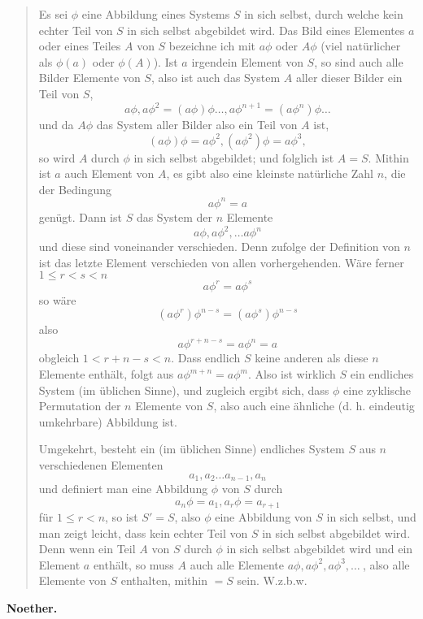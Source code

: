\documentclass[leqno,hidelinks]{article}
\theoremstyle{definition}
\begin{document}
\begin{paracol}{2}
\begin{quote}
\hspace{12pt} Es sei $\phi$ eine Abbildung eines Systems $S$ in sich selbst, durch
welche kein echter Teil von $S$ in sich selbst abgebildet wird. Das Bild eines
Elementes $a$ oder eines Teiles $A$ von $S$ bezeichne ich mit $a\phi$ oder $A\phi$
(viel natürlicher als $\phi(a)$ oder $\phi(A)$). Ist $a$ irgendein Element von $S$,
so sind auch alle Bilder Elemente von $S$, also ist auch das System $A$ aller dieser
Bilder ein Teil von $S$,
\[
	a\phi, a\phi^2= (a\phi)\phi \ldots, a\phi^{n+1} = (a\phi^n)\phi \ldots
\]
und da $A\phi$ das System aller Bilder also ein Teil von $A$ ist,
\[
	(a\phi) \phi = a\phi^2, (a\phi^2)\phi = a\phi^3,
\]
so wird $A$ durch $\phi$ in sich selbst abgebildet; und folglich ist $A = S$.
Mithin ist $a$ auch Element von $A$,  es gibt also eine kleinste natürliche Zahl
$n$, die der Bedingung%
\[
	a\phi^n = a
\]
genügt. Dann ist $S$ das System der $n$ Elemente
\[
	a\phi,a\phi^2,\ldots a\phi^n
\]
und diese sind voneinander verschieden. Denn zufolge der Definition von $n$ ist das
letzte Element verschieden von allen vorhergehenden. Wäre ferner $1 \leq r<s < n$%
\[
	a\phi^r = a\phi^s
\]
so wäre
\[
	(a\phi^r)\phi^{n-s} = (a\phi^s) \phi^{n-s}
\]
also
\[
	a\phi^{r+n-s} = a\phi^n = a
\]
obgleich $1 < r + n - s < n$. Dass endlich $S$ keine anderen als diese $n$ Elemente
enthält, folgt aus $a\phi^{m + n} = a\phi^m$. Also ist wirklich $S$ ein endliches
System (im üblichen Sinne), und zugleich ergibt sich, dass $\phi$ eine zyklische
Permutation der $n$ Elemente von $S$, also auch eine ähnliche (d. h. eindeutig
umkehrbare) Abbildung ist.

\hspace{12pt} Umgekehrt, besteht ein (im üblichen Sinne) endliches System $S$ aus
$n$ verschiedenen Elementen
\[
	a_1, a_2 \ldots a_{n-1}, a_n
\]
und definiert man eine Abbildung $\phi$ von $S$ durch
\[
    a_n\phi = a_1, a_r\phi = a_{r+1}
\]
für $1 \leq r < n$, so ist $S' = S$, also $\phi$ eine Abbildung von $S$ in sich
selbst, und man zeigt leicht, dass kein echter Teil von $S$ in sich selbst
abgebildet wird. Denn wenn ein Teil $A$ von $S$ durch $\phi$ in sich selbst
abgebildet wird und ein Element $a$ enthält, so muss $A$ auch alle Elemente
$a\phi, a\phi^2, a\phi^3, \ldots\ $, also alle Elemente von $S$ enthalten,
mithin $= S$ sein. W.z.b.w.\grqq{}
\end{quote}

\vspace{-20pt} \begin{flushright} \textbf{Noether.}\end{flushright}



\end{paracol}
\end{document}
